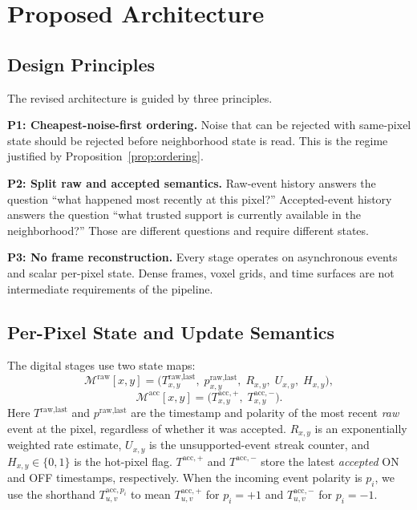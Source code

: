 \documentclass[a4paper,fleqn]{cas-dc}
\begin{document}
\section{Proposed Architecture}
\label{sec:architecture}

\subsection{Design Principles}
\label{sec:principles}

The revised architecture is guided by three principles.

\textbf{P1: Cheapest-noise-first ordering.}
Noise that can be rejected with same-pixel state should be rejected before neighborhood state is read. This is the regime justified by Proposition~\ref{prop:ordering}.

\textbf{P2: Split raw and accepted semantics.}
Raw-event history answers the question ``what happened most recently at this pixel?'' Accepted-event history answers the question ``what trusted support is currently available in the neighborhood?'' Those are different questions and require different states.

\textbf{P3: No frame reconstruction.}
Every stage operates on asynchronous events and scalar per-pixel state. Dense frames, voxel grids, and time surfaces are not intermediate requirements of the pipeline.

\subsection{Per-Pixel State and Update Semantics}
\label{sec:state}

The digital stages use two state maps:
\begin{equation}
\mathcal{M}^{\text{raw}}[x,y] =
\Big(
T_{x,y}^{\text{raw,last}},
\; p_{x,y}^{\text{raw,last}},
\; R_{x,y},
\; U_{x,y},
\; H_{x,y}
\Big),
\label{eq:state_raw}
\end{equation}
\begin{equation}
\mathcal{M}^{\text{acc}}[x,y] =
\Big(
T_{x,y}^{\text{acc},+},
\; T_{x,y}^{\text{acc},-}
\Big).
\label{eq:state_acc}
\end{equation}
Here $T^{\text{raw,last}}$ and $p^{\text{raw,last}}$ are the timestamp and polarity of the most recent \emph{raw} event at the pixel, regardless of whether it was accepted. $R_{x,y}$ is an exponentially weighted rate estimate, $U_{x,y}$ is the unsupported-event streak counter, and $H_{x,y}\in\{0,1\}$ is the hot-pixel flag. $T^{\text{acc},+}$ and $T^{\text{acc},-}$ store the latest \emph{accepted} ON and OFF timestamps, respectively.
When the incoming event polarity is $p_i$, we use the shorthand $T_{u,v}^{\text{acc},p_i}$ to mean $T_{u,v}^{\text{acc},+}$ for $p_i=+1$ and $T_{u,v}^{\text{acc},-}$ for $p_i=-1$.
\end{document}
